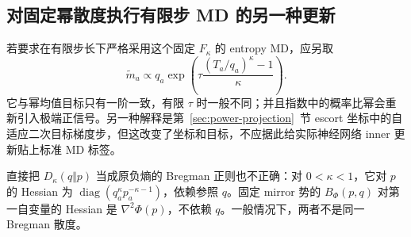 \subsection{对固定幂散度执行有限步 MD 的另一种更新}

若要求在有限步长下严格采用这个固定 $F_\kappa$ 的 entropy MD，应另取
\begin{equation}
 \widetilde m_a\propto q_a
   \exp\left(\tau\frac{(T_a/q_a)^\kappa-1}{\kappa}\right).
 \label{eq:power-bpo-true-md-variant}
\end{equation}
它与幂均值目标只有一阶一致，有限 $\tau$ 时一般不同；并且指数中的概率比幂会重新引入极端正信号。另一种解释是第~\ref{sec:power-projection}~节 escort 坐标中的自适应二次目标梯度步，但这改变了坐标和目标，不应据此给实际神经网络 inner 更新贴上标准 MD 标签。

直接把 $D_\kappa(q\Vert p)$ 当成原负熵的 Bregman 正则也不正确：对 $0<\kappa<1$，它对 $p$ 的 Hessian 为 $\operatorname{diag}(q_a^\kappa p_a^{-\kappa-1})$，依赖参照 $q$。固定 mirror 势的 $B_\Phi(p,q)$ 对第一自变量的 Hessian 是 $\nabla^2\Phi(p)$，不依赖 $q$。一般情况下，两者不是同一 Bregman 散度。
